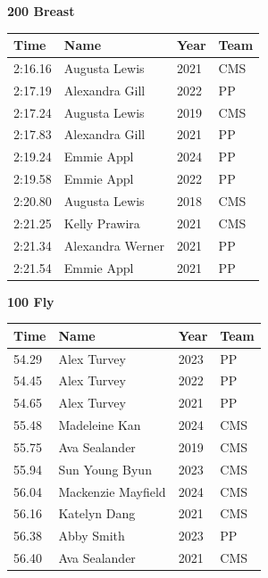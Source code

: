 \vspace{1.2em}
\noindent\begin{minipage}[t]{0.98\textwidth}
\centering
\textbf{\textcolor{teamprimary}{200 Breast}}\par
\vspace{0.5em}
\centering
\small
\renewcommand{\arraystretch}{1.0}
\setlength{\tabcolsep}{4pt}
\begin{tabular}{@{}p{2.5cm}p{4.5cm}p{1.5cm}p{2.5cm}@{}}
\toprule
\textbf{Time} & \textbf{Name} & \textbf{Year} & \textbf{Team} \\
\midrule
2:16.16 & Augusta Lewis & 2021 & CMS \\
2:17.19 & Alexandra Gill & 2022 & PP \\
2:17.24 & Augusta Lewis & 2019 & CMS \\
2:17.83 & Alexandra Gill & 2021 & PP \\
2:19.24 & Emmie Appl & 2024 & PP \\
2:19.58 & Emmie Appl & 2022 & PP \\
2:20.80 & Augusta Lewis & 2018 & CMS \\
2:21.25 & Kelly Prawira & 2021 & CMS \\
2:21.34 & Alexandra Werner & 2021 & PP \\
2:21.54 & Emmie Appl & 2021 & PP \\
\bottomrule
\end{tabular}
\end{minipage}
\vspace{1.2em}
\noindent\begin{minipage}[t]{0.98\textwidth}
\centering
\textbf{\textcolor{teamprimary}{100 Fly}}\par
\vspace{0.5em}
\centering
\small
\renewcommand{\arraystretch}{1.0}
\setlength{\tabcolsep}{4pt}
\begin{tabular}{@{}p{2.5cm}p{4.5cm}p{1.5cm}p{2.5cm}@{}}
\toprule
\textbf{Time} & \textbf{Name} & \textbf{Year} & \textbf{Team} \\
\midrule
54.29 & Alex Turvey & 2023 & PP \\
54.45 & Alex Turvey & 2022 & PP \\
54.65 & Alex Turvey & 2021 & PP \\
55.48 & Madeleine Kan & 2024 & CMS \\
55.75 & Ava Sealander & 2019 & CMS \\
55.94 & Sun Young Byun & 2023 & CMS \\
56.04 & Mackenzie Mayfield & 2024 & CMS \\
56.16 & Katelyn Dang & 2021 & CMS \\
56.38 & Abby Smith & 2023 & PP \\
56.40 & Ava Sealander & 2021 & CMS \\
\bottomrule
\end{tabular}
\end{minipage}
